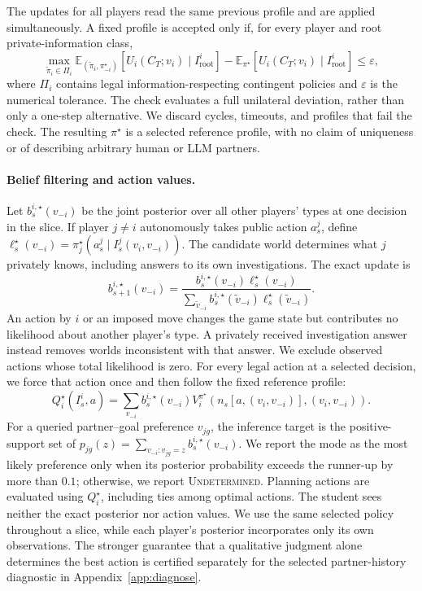 The updates for all players read the same previous profile and are applied
simultaneously. A fixed profile is accepted only if, for every player and
root private-information class,
\begin{equation}
 \max_{\widetilde\pi_i\in\Pi_i}
 \mathbb E_{(\widetilde\pi_i,\pi_{-i}^\star)}
 [U_i(C_T;v_i)\mid I_{\mathrm{root}}^i]
 -
 \mathbb E_{\pi^\star}
 [U_i(C_T;v_i)\mid I_{\mathrm{root}}^i]
 \leq\varepsilon ,
 \label{eq:oracle-certificate}
\end{equation}
where $\Pi_i$ contains legal information-respecting contingent policies and
$\varepsilon$ is the numerical tolerance. The check evaluates a full
unilateral deviation, rather than only a one-step alternative. We discard
cycles, timeouts, and profiles that fail the check. The resulting
$\pi^\star$ is a selected reference profile, with no claim of uniqueness or
of describing arbitrary human or LLM partners.

\paragraph{Belief filtering and action values.}
Let $b_s^{i,\star}(v_{-i})$ be the joint posterior over all other players'
types at one decision in the slice. If player $j\ne i$ autonomously takes
public action $a_s^j$, define
$\ell_s^\star(v_{-i})=
\pi_j^\star(a_s^j\mid I_s^j(v_i,v_{-i}))$.
The candidate world determines what $j$ privately knows, including answers
to its own investigations. The exact update is
\begin{equation}
 b_{s+1}^{i,\star}(v_{-i})=
 \frac{b_s^{i,\star}(v_{-i})\ell_s^\star(v_{-i})}
 {\sum_{\widetilde v_{-i}}
 b_s^{i,\star}(\widetilde v_{-i})\ell_s^\star(\widetilde v_{-i})}.
 \label{eq:oracle-belief}
\end{equation}
An action by $i$ or an imposed move changes the game state but contributes no
likelihood about another player's type. A privately received investigation
answer instead removes worlds inconsistent with that answer. We exclude
observed actions whose total likelihood is zero. For every legal action at a
selected decision, we force that action once and then follow the fixed
reference profile:
\begin{equation}
 Q_i^\star(I_s^i,a)=
 \sum_{v_{-i}}b_s^{i,\star}(v_{-i})
 V_i^{\pi^\star}(n_s[a,(v_i,v_{-i})],(v_i,v_{-i})).
 \label{eq:oracle-action-value}
\end{equation}
For a queried partner--goal preference $v_{jg}$, the inference target is the
positive-support set of
$p_{jg}(z)=\sum_{v_{-i}:v_{jg}=z}b_s^{i,\star}(v_{-i})$.
We report the mode as the most likely preference only when its posterior
probability exceeds the runner-up by more than $0.1$; otherwise, we report
\textsc{Undetermined}. Planning actions are
evaluated using $Q_i^\star$,
including ties among optimal actions. The student sees neither the exact
posterior nor action values. We use the same selected policy throughout a
slice, while each player's posterior incorporates only its own observations.
The stronger guarantee
that a qualitative judgment alone determines the best action is certified
separately for the selected partner-history diagnostic in Appendix~\ref{app:diagnose}.
